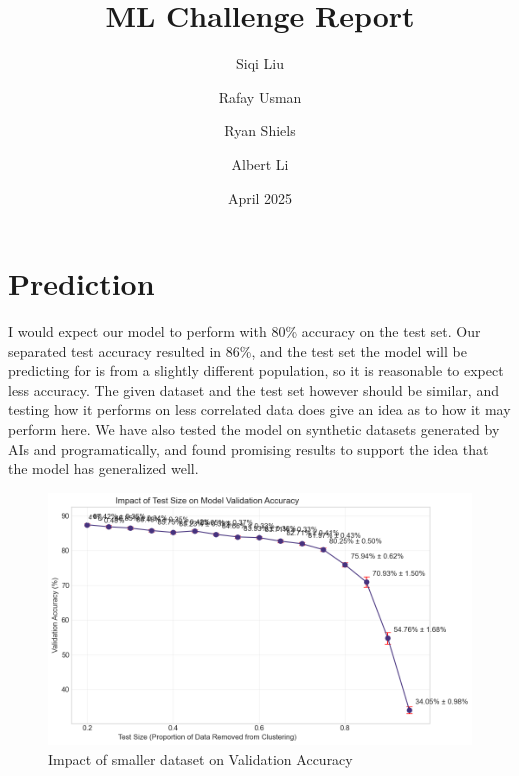\documentclass[journal]{IEEEtran}
\title{ML Challenge Report}
\author{
  Siqi Liu
  \and
  Rafay Usman
  \and
  Ryan Shiels
  \and
  Albert Li
}
\date{April 2025}
\begin{document}
\maketitle







\section{Prediction}
I would expect our model to perform with 80\% accuracy on the test set. Our separated test accuracy resulted in 86\%, and the test set the model will be predicting for is from a slightly different population, so it is reasonable to expect less accuracy.
The given dataset and the test set however should be similar, and testing how it performs on less correlated data does give an idea as to how it may perform here. We have also tested the model on synthetic datasets generated by AIs and programatically, and found promising results to support the idea that the model has generalized well.
\begin{figure}[ht]
  \centerline{\includegraphics[width=\columnwidth]{TestSize.png}}
  \caption{Impact of smaller dataset on Validation Accuracy}
  \label{f:testsize_diagram}
\end{figure}
\end{document}
